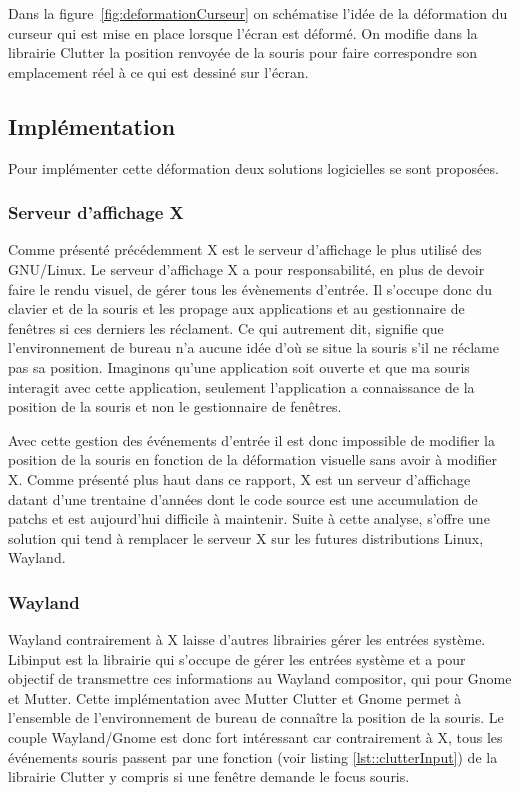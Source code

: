 Dans la figure~\ref{fig:deformationCurseur} on schématise l'idée de la déformation du curseur qui est mise en place lorsque l'écran est déformé. On modifie dans la librairie Clutter la position renvoyée de la souris pour faire correspondre son emplacement réel à ce qui est dessiné sur l'écran.

\subsection{Implémentation }

Pour implémenter cette déformation deux solutions logicielles se sont proposées. 

\subsubsection{Serveur d'affichage X}

Comme présenté précédemment X est le serveur d'affichage le plus utilisé des GNU/Linux. Le serveur d'affichage X a pour responsabilité, en plus de devoir faire le rendu visuel, de gérer tous les évènements d'entrée. Il s'occupe donc du clavier et de la souris et les propage aux applications et au gestionnaire de fenêtres si ces derniers les réclament. Ce qui autrement dit, signifie que l'environnement de bureau n'a aucune idée d'où se situe la souris s'il ne réclame pas sa position. Imaginons qu'une application soit ouverte et que ma souris interagit avec cette application, seulement l'application a connaissance de la position de la souris et non le gestionnaire de fenêtres.

Avec cette gestion des événements d'entrée il est donc impossible de modifier la position de la souris en fonction de la déformation visuelle sans avoir à modifier X. Comme présenté plus haut dans ce rapport, X est un serveur d'affichage datant d'une trentaine d'années dont le code source est une accumulation de patchs et est aujourd'hui difficile à maintenir. Suite à cette analyse, s'offre une solution qui tend à remplacer le serveur X sur les futures distributions Linux, Wayland.

\subsubsection{Wayland}
Wayland contrairement à X laisse d'autres librairies gérer les entrées système. 
Libinput est la librairie qui s'occupe de gérer les entrées système et a pour objectif de transmettre ces informations au Wayland compositor, qui pour Gnome et Mutter. Cette implémentation avec Mutter Clutter et Gnome permet à l'ensemble de l'environnement de bureau de connaître la position de la souris.
Le couple Wayland/Gnome est donc fort intéressant car contrairement à X, tous les événements souris passent par une fonction (voir listing \ref{lst::clutterInput}) de la librairie Clutter y compris si une fenêtre demande le focus souris. 

